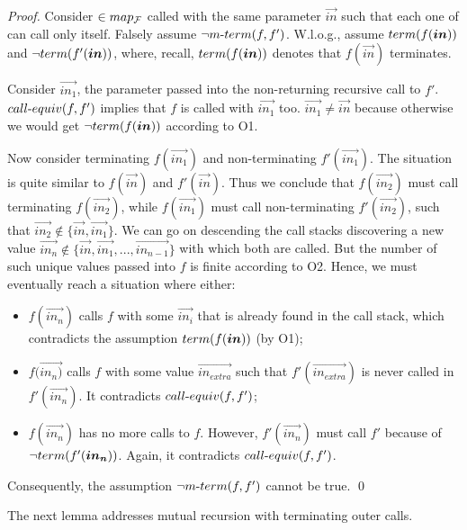 \begin{proof}Consider $ \in map_{\cal F}$ called with the same parameter
$\vec{in}$ such that each one of  can call only itself. Falsely assume $\lnot m\mbox{-}term{(f, f'})$. W.l.o.g., assume $\term{f(\vec{in})}$ and  $\lnot\term{f'(\vec{in})}$, where, recall, $\term{f(\vec{in})}$ denotes that $f(\vec{in})$ terminates.

Consider $\vec{in_1}$, the parameter passed into the non-returning
recursive call to $f'$. $call\mbox{-}equiv{(f, f'})$ implies that $f$ is called
with $\vec{in_1}$ too. $\vec{in_1} \neq \vec{in}$ because otherwise we would get $\lnot\term{f(\vec{in})}$ according to O1.

Now consider terminating $f(\vec{in_1})$ and non-terminating $f'(\vec{in_1})$.
The situation is quite similar to $f(\vec{in})$ and $f'(\vec{in})$. Thus we
conclude that $f(\vec{in_2})$ must call terminating $f(\vec{in_2})$, while
 $f(\vec{in_1})$ must call non-terminating $f'(\vec{in_2})$, such that $\vec{in_2}
\notin \{\vec{in}, \vec{in_1}\}$. We can go on descending the call stacks
discovering a new value $\vec{in_n} \notin \{\vec{in}, \vec{in_1}, ...,
\vec{in_{n-1}}\}$ with which both  are called. But the number of
such unique values passed into $f$ is finite according to O2. Hence,
we must eventually reach a situation where either:
\begin{itemize}
\item $f(\vec{in_n})$ calls $f$ with some $\vec{in_i}$ that is already found
    in the call stack, which contradicts the assumption $\term{f(\vec{in})}$ (by O1);
\item $f(\vec{in_n)}$ calls $f$ with some value $\vec{in_{extra}}$ such that
    $f'(\vec{in_{extra}})$ is never called in $f'(\vec{in_n})$. It contradicts $call\mbox{-}equiv{(f, f'})$;
\item $f(\vec{in_n})$ has no more calls to $f$. However,  $f'(\vec{in_n})$ must call $f'$ because of $\lnot\term{f'(\vec{in_n})}$.
    Again, it contradicts $call\mbox{-}equiv{(f, f'})$.
\end{itemize}
Consequently, the assumption $\lnot m\mbox{-}term{(f, f'})$ cannot be true.
\qed
\end{proof}


The next lemma addresses mutual recursion with terminating outer calls.


